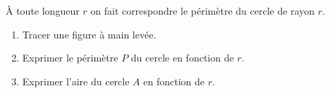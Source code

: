 \documentclass[exercice]{thedocument}%
\begin{document}
%
À toute longueur $r$ on fait correspondre le périmètre du cercle de rayon $r$.
\begin{enumerate}
  \item Tracer une figure à main levée.
  \item Exprimer le périmètre $P$ du cercle en fonction de $r$.
  \item Exprimer l'aire du cercle $A$ en fonction de $r$.
\end{enumerate}
\end{document}
